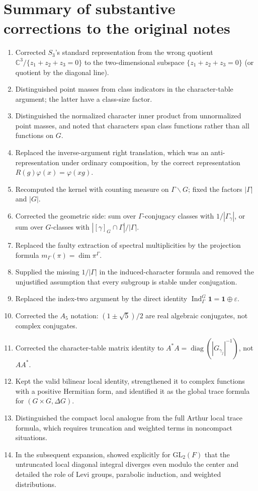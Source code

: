 \documentclass[12pt]{article}
\theoremstyle{remark}
\newcommand{\C}{\mathbb C}
\newcommand{\Ind}{\operatorname{Ind}}
\newcommand{\id}{\mathbf 1}
\newcommand{\eps}{\varepsilon}
\newcommand{\diag}{\operatorname{diag}}
\begin{document}
\section{Summary of substantive corrections to the original notes}
\begin{enumerate}[leftmargin=*,itemsep=5pt]
\item Corrected $S_3$'s standard representation from the wrong
quotient $\C^3/\{z_1+z_2+z_3=0\}$ to the two-dimensional
subspace $\{z_1+z_2+z_3=0\}$ (or quotient by the diagonal line).
\item Distinguished point masses from class indicators in the
character-table argument; the latter have a class-size factor.
\item Distinguished the normalized character inner product from
unnormalized point masses, and noted that characters span class
functions rather than all functions on $G$.
\item Replaced the inverse-argument right translation, which was an
anti-representation under ordinary composition, by the correct
representation $R(g)\varphi(x)=\varphi(xg)$.
\item Recomputed the kernel with counting measure on
$\Gamma\backslash G$; fixed the factors $|\Gamma|$ and $|G|$.
\item Corrected the geometric side: sum over $\Gamma$-conjugacy
classes with $1/|\Gamma_\gamma|$, or sum over $G$-classes with
$|[\gamma]_G\cap\Gamma|/|\Gamma|$.
\item Replaced the faulty extraction of spectral multiplicities
by the projection formula $m_\Gamma(\pi)=\dim\pi^\Gamma$.
\item Supplied the missing $1/|\Gamma|$ in the induced-character
formula and removed the unjustified assumption that every subgroup
is stable under conjugation.
\item Replaced the index-two argument by the direct identity
$\Ind_\Gamma^G\id=\id\oplus\eps$.
\item Corrected the $A_5$ notation: $(1\pm\sqrt5)/2$ are real
algebraic conjugates, not complex conjugates.
\item Corrected the character-table matrix identity to
$A^*A=\diag(|G_{\gamma_j}|^{-1})$, not $AA^*$.
\item Kept the valid bilinear local identity, strengthened it to
complex functions with a positive Hermitian form, and identified it
as the global trace formula for $(G\times G,\Delta G)$.
\item Distinguished the compact local analogue from the full
Arthur local trace formula, which requires truncation and weighted
terms in noncompact situations.
\item In the subsequent expansion, showed explicitly for
$\mathrm{GL}_2(F)$ that the untruncated local diagonal integral
diverges even modulo the center and detailed the role of Levi groups,
parabolic induction, and weighted distributions.
\end{enumerate}
\end{document}
